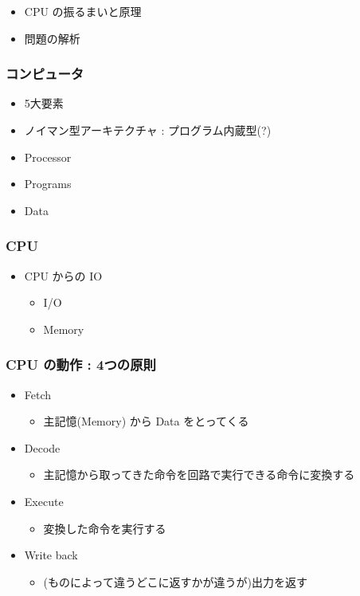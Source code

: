 \documentclass{jsarticle}
\begin{document}
\begin{itemize}
\item
  CPU の振るまいと原理
\item
  問題の解析
\end{itemize}
\subsubsection{コンピュータ}

\begin{itemize}
\item
  5大要素
\item
  ノイマン型アーキテクチャ : プログラム内蔵型(?)
\item
  Processor
\item
  Programs
\item
  Data
\end{itemize}
\subsubsection{CPU}

\begin{itemize}
\item
  CPU からの IO
  \begin{itemize}
  \item
    I/O
  \item
    Memory
  \end{itemize}
\end{itemize}
\subsubsection{CPU の動作 : 4つの原則}

\begin{itemize}
\item
  Fetch
  \begin{itemize}
  \item
    主記憶(Memory) から Data をとってくる
  \end{itemize}
\item
  Decode
  \begin{itemize}
  \item
    主記憶から取ってきた命令を回路で実行できる命令に変換する
  \end{itemize}
\item
  Execute
  \begin{itemize}
  \item
    変換した命令を実行する
  \end{itemize}
\item
  Write back
  \begin{itemize}
  \item
    (ものによって違うどこに返すかが違うが)出力を返す
  \end{itemize}
\end{itemize}
\end{document}
